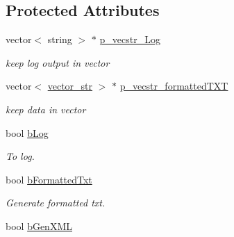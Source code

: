 \subsection*{Protected Attributes}
\begin{DoxyCompactItemize}
\item 
\hypertarget{classstats__keeper_a63b7a9f360e0a77d64236c59427c5a70}{
vector$<$ string $>$ $\ast$ \hyperlink{classstats__keeper_a63b7a9f360e0a77d64236c59427c5a70}{p\_\-vecstr\_\-Log}}
\label{classstats__keeper_a63b7a9f360e0a77d64236c59427c5a70}

\begin{DoxyCompactList}\small\item\em keep log output in vector \item\end{DoxyCompactList}\item 
\hypertarget{classstats__keeper_ace46f580da108c5ddbef12d0733f4569}{
vector$<$ \hyperlink{structvector__str}{vector\_\-str} $>$ $\ast$ \hyperlink{classstats__keeper_ace46f580da108c5ddbef12d0733f4569}{p\_\-vecstr\_\-formattedTXT}}
\label{classstats__keeper_ace46f580da108c5ddbef12d0733f4569}

\begin{DoxyCompactList}\small\item\em keep data in vector \item\end{DoxyCompactList}\item 
\hypertarget{classstats__keeper_a9d490ff7931f71f3cc8f925b8a7cdd8b}{
bool \hyperlink{classstats__keeper_a9d490ff7931f71f3cc8f925b8a7cdd8b}{bLog}}
\label{classstats__keeper_a9d490ff7931f71f3cc8f925b8a7cdd8b}

\begin{DoxyCompactList}\small\item\em To log. \item\end{DoxyCompactList}\item 
\hypertarget{classstats__keeper_a1e4fed8a069f534f85c5bc0b4054bbe6}{
bool \hyperlink{classstats__keeper_a1e4fed8a069f534f85c5bc0b4054bbe6}{bFormattedTxt}}
\label{classstats__keeper_a1e4fed8a069f534f85c5bc0b4054bbe6}

\begin{DoxyCompactList}\small\item\em Generate formatted txt. \item\end{DoxyCompactList}\item 
\hypertarget{classstats__keeper_a575bbfaa39e0f4d816d9229bc5d19795}{
bool \hyperlink{classstats__keeper_a575bbfaa39e0f4d816d9229bc5d19795}{bGenXML}}
\label{classstats__keeper_a575bbfaa39e0f4d816d9229bc5d19795}


\end{DoxyCompactItemize}
